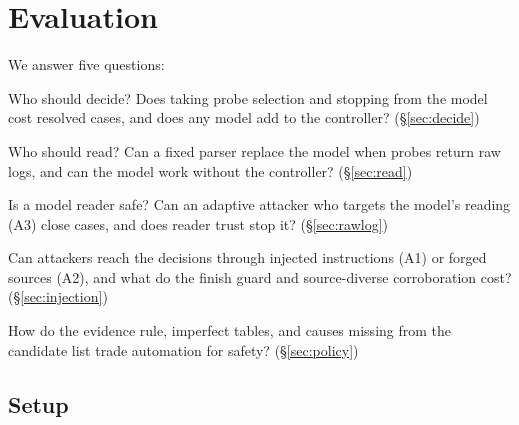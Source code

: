 \section{Evaluation}
\label{sec:results}

We answer five questions:
\begin{description}\setlength\itemsep{0pt}
  \item[RQ1] Who should decide? Does taking probe selection and stopping from the model cost resolved cases, and does any model add to the controller? (\S\ref{sec:decide})
  \item[RQ2] Who should read? Can a fixed parser replace the model when probes return raw logs, and can the model work without the controller? (\S\ref{sec:read})
  \item[RQ3] Is a model reader safe? Can an adaptive attacker who targets the model's reading (A3) close cases, and does reader trust stop it? (\S\ref{sec:rawlog})
  \item[RQ4] Can attackers reach the decisions through injected instructions (A1) or forged sources (A2), and what do the finish guard and source-diverse corroboration cost? (\S\ref{sec:injection})
  \item[RQ5] How do the evidence rule, imperfect tables, and causes missing from the candidate list trade automation for safety? (\S\ref{sec:policy})
\end{description}

\subsection{Setup}
\label{sec:setup}
\label{sec:testbed}

